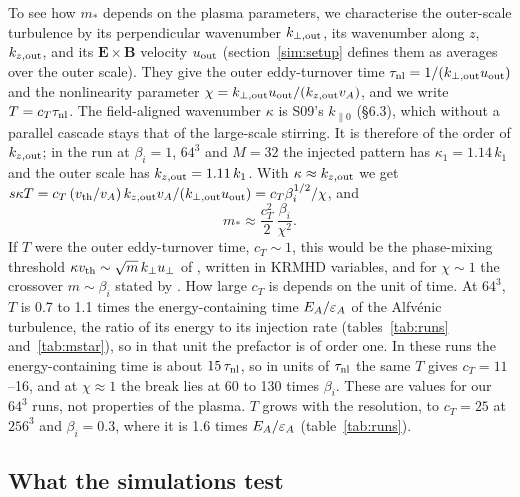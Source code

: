 To see how $m_*$ depends on the plasma parameters, we characterise the outer-scale turbulence by its perpendicular wavenumber $k_{\perp,\rm out}$, its wavenumber along $z$, $k_{z,\rm out}$, and its $\boldsymbol E\times\boldsymbol B$ velocity $u_{\rm out}$ (section~\ref{sim:setup} defines them as averages over the outer scale). They give the outer eddy-turnover time $\tau_{\rm nl}=1/(k_{\perp,\rm out}u_{\rm out})$ and the nonlinearity parameter $\chi=k_{\perp,\rm out}u_{\rm out}/(k_{z,\rm out}v_A)$, and we write $T=c_T\tau_{\rm nl}$. The field-aligned wavenumber $\kappa$ is S09's $k_{\parallel0}$ (\S6.3), which without a parallel cascade stays that of the large-scale stirring. It is therefore of the order of $k_{z,\rm out}$; in the run at $\beta_i=1$, $64^3$ and $M=32$ the injected pattern has $\kappa_1=1.14\,k_1$ and the outer scale has $k_{z,\rm out}=1.11\,k_1$. With $\kappa\approx k_{z,\rm out}$ we get $s\kappa T=c_T\,(v_{\mathrm{th}}/v_A)\,k_{z,\rm out}v_A/(k_{\perp,\rm out}u_{\rm out})=c_T\beta_i^{1/2}/\chi$, and
\begin{equation}\label{eq:mstar-scaling}
  m_*\approx\frac{c_T^2}{2}\,\frac{\beta_i}{\chi^2} .
\end{equation}
If $T$ were the outer eddy-turnover time, $c_T\sim1$, this would be the phase-mixing threshold $\kappa v_{\mathrm{th}}\sim\sqrt m\,k_\perp u_\perp$ of \citet[eq.~4.5]{Schekochihin2016}, written in KRMHD variables, and for $\chi\sim1$ the crossover $m\sim\beta_i$ stated by \citet{Kawazura2019}. How large $c_T$ is depends on the unit of time. At $64^3$, $T$ is 0.7 to 1.1 times the energy-containing time $E_A/\varepsilon_A$ of the Alfv\'enic turbulence, the ratio of its energy to its injection rate (tables~\ref{tab:runs} and~\ref{tab:mstar}), so in that unit the prefactor is of order one. In these runs the energy-containing time is about $15\,\tau_{\rm nl}$, so in units of $\tau_{\rm nl}$ the same $T$ gives $c_T=11$--16, and at $\chi\approx1$ the break lies at 60 to 130 times $\beta_i$. These are values for our $64^3$ runs, not properties of the plasma. $T$ grows with the resolution, to $c_T=25$ at $256^3$ and $\beta_i=0.3$, where it is 1.6 times $E_A/\varepsilon_A$ (table~\ref{tab:runs}).

\subsection{What the simulations test}\label{tc:predictions}

